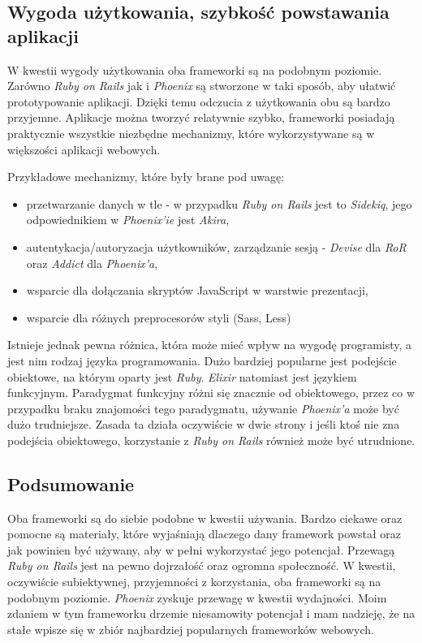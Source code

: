 \documentclass[mgr,oneside]{mgr}
\begin{document}
\subsection{Wygoda użytkowania, szybkość powstawania aplikacji}
W kwestii wygody użytkowania oba frameworki są na podobnym poziomie. Zarówno \textit{Ruby on Rails} jak i \textit{Phoenix} są stworzone w taki sposób, aby ułatwić prototypowanie aplikacji. Dzięki temu odczucia z użytkowania obu są bardzo przyjemne. Aplikacje można tworzyć relatywnie szybko, frameworki posiadają praktycznie wszystkie niezbędne mechanizmy, które wykorzystywane są w większości aplikacji webowych.

Przykładowe mechanizmy, które były brane pod uwagę:
\begin{itemize}
  \item przetwarzanie danych w tle - w przypadku \textit{Ruby on Rails} jest to \textit{Sidekiq}, jego odpowiednikiem w \textit{Phoenix'ie} jest \textit{Akira},
  \item autentykacja/autoryzacja użytkowników, zarządzanie sesją - \textit{Devise} dla \textit{RoR} oraz \textit{Addict} dla \textit{Phoenix'a},
  \item wsparcie dla dołączania skryptów JavaScript w warstwie prezentacji,
  \item wsparcie dla różnych preprocesorów styli (Sass, Less)
\end{itemize}

Istnieje jednak pewna różnica, która może mieć wpływ na wygodę programisty, a jest nim rodzaj języka programowania. Dużo bardziej popularne jest podejście obiektowe, na którym oparty jest \textit{Ruby}. \textit{Elixir} natomiast jest językiem funkcyjnym. Paradygmat funkcyjny różni się znacznie od obiektowego, przez co w przypadku braku znajomości tego paradygmatu, używanie \textit{Phoenix'a} może być dużo trudniejsze. Zasada ta działa oczywiście w dwie strony i jeśli ktoś nie zna podejścia obiektowego, korzystanie z \textit{Ruby on Rails} również może być utrudnione.

\subsection{Podsumowanie}
Oba frameworki są do siebie podobne w kwestii używania. Bardzo ciekawe oraz pomocne są materiały, które wyjaśniają dlaczego dany framework powstał oraz jak powinien być używany, aby w pełni wykorzystać jego potencjał. Przewagą \textit{Ruby on Rails} jest na pewno dojrzałość oraz ogromna społeczność. W kwestii, oczywiście subiektywnej, przyjemności z korzystania, oba frameworki są na podobnym poziomie. \textit{Phoenix} zyskuje przewagę w kwestii wydajności. Moim zdaniem w tym frameworku drzemie niesamowity potencjał i mam nadzieję, że na stałe wpisze się w zbiór najbardziej popularnych frameworków webowych.
\end{document}
